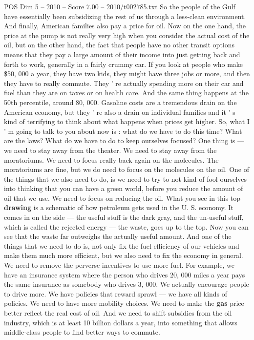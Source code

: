 \begin{textsample}{POS Dim 5 – 2010 – Score 7.00 – 2010/t002785.txt}
So the people of the Gulf have essentially been subsidizing the rest of us through a less-clean environment.
And finally, American families also pay a price for oil.
Now on the one hand, the price at the pump is not really very high when you consider the actual cost of the oil, but on the other hand, the fact that people have no other transit options means that they pay a large amount of their income into just getting back and forth to work, generally in a fairly crummy car.
If you look at people who make \$50, 000 a year, they have two kids, they might have three jobs or more, and then they have to really commute.
They ' re actually spending more on their car and fuel than they are on taxes or on health care.
And the same thing happens at the 50th percentile, around 80, 000.
Gasoline costs are a tremendous drain on the American economy, but they ' re also a drain on individual families and it ' s kind of terrifying to think about what happens when prices get higher.
So, what I ' m going to talk to you about now is : what do we have to do this time?
What are the laws?
What do we have to do to keep ourselves focused?
One thing is — we need to stay away from the theater.
We need to stay away from the moratoriums.
We need to focus really back again on the molecules.
The moratoriums are fine, but we do need to focus on the molecules on the oil.
One of the things that we also need to do, is we need to try to not kind of fool ourselves into thinking that you can have a green world, before you reduce the amount of oil that we use.
We need to focus on reducing the oil.
What you see in this top \textbf{drawing} is a schematic of how petroleum gets used in the U.
S. economy.
It comes in on the side — the useful stuff is the dark gray, and the un-useful stuff, which is called the rejected energy — the waste, goes up to the top.
Now you can see that the waste far outweighs the actually useful amount.
And one of the things that we need to do is, not only fix the fuel efficiency of our vehicles and make them much more efficient, but we also need to fix the economy in general.
We need to remove the perverse incentives to use more fuel.
For example, we have an insurance system where the person who drives 20, 000 miles a year pays the same insurance as somebody who drives 3, 000.
We actually encourage people to drive more.
We have policies that reward sprawl — we have all kinds of policies.
We need to have more mobility choices.
We need to make the \textbf{gas} price better reflect the real cost of oil.
And we need to shift subsidies from the oil industry, which is at least 10 billion dollars a year, into something that allows middle-class people to find better ways to commute.

\end{textsample}
